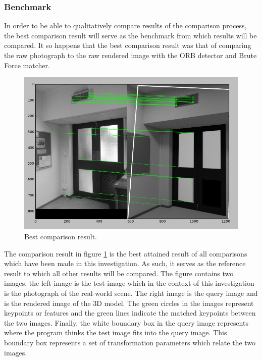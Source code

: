 \documentclass[11pt,a4paper]{report}
\begin{document}
			\subsubsection{Benchmark}
			\label{benchmark}
				In order to be able to qualitatively compare results of the comparison process, the best comparison result will serve as the benchmark from which results will be compared. It so happens that the best comparison result was that of comparing the raw photograph to the raw rendered image with the ORB detector and Brute Force matcher.
				
				\begin{figure}[H]
					\centering
					\includegraphics[width=1\textwidth]{best_comparason}
					\caption[Best comparison result]{Best comparison result.}
					\label{fig:best_comparason}
				\end{figure}
				
				The comparison result in figure \ref{fig:best_comparason} is the best attained result of all comparisons which have been made in this investigation. As such, it serves as the reference result to which all other results will be compared. The figure contains two images, the left image is the test image which in the context of this investigation is the photograph of the real-world scene. The right image is the query image and is the rendered image of the 3D model. The green circles in the images represent keypoints or features and the green lines indicate the matched keypoints between the two images. Finally, the white boundary box in the query image represents where the program thinks the test image fits into the query image. This boundary box represents a set of transformation parameters which relate the two images.
			
\end{document}
